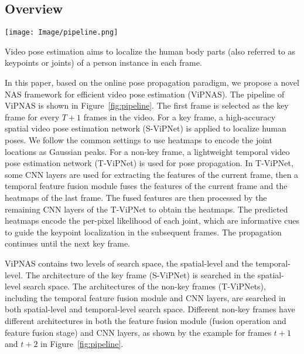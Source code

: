 \documentclass[final]{cvpr}
\begin{document}
\subsection{Overview}
\begin{figure*}[t]
	\centering
	\texttt{[image: Image/pipeline.png]}
	\caption{ViPNAS consists of one image-based key frame pose model S-ViPNet, and $T$ video-based pose model T-ViPNets containing temporal feature module and various CNN architectures. Videos are processed frame-by-frame in an online mode. S-ViPNet first predicts the pose heatmaps $H^t$ of the key frame $t$, and propagates them to the next frame $t+1$. T-ViPNet selects the CNN architecture, as well as the input features (\eg $F_1$ to $F_4$) and fusion operation (\eg Add, Cat and Mul) of fusion module. The fusion module combines the selected feature $F_2^{t+1}$ with the propagated heatmaps $H^t$, and generates the fused features $\hat{F}_2^{t+1}$ for predicting the heatmaps $H^{t+1}$.}
	\label{fig:pipeline}
\end{figure*}


Video pose estimation aims to localize the human body parts (also referred to as keypoints or joints) of a person instance in each frame. 

In this paper, based on the online pose propagation paradigm, we propose a novel NAS framework for efficient video pose estimation (ViPNAS). The pipeline of ViPNAS is shown in Figure~\ref{fig:pipeline}. The first frame is selected as the key frame for every $T+1$ frames in the video. For a key frame, a high-accuracy spatial video pose estimation network (S-ViPNet) is applied to localize human poses. We follow the common settings to use heatmaps to encode the joint locations as Gaussian peaks. For a non-key frame, a lightweight temporal video pose estimation network (T-ViPNet) is used for pose propagation. In T-ViPNet, some CNN layers are used for extracting the features of the current frame, then a temporal feature fusion module fuses the features of the current frame and the heatmaps of the last frame. The fused features are then processed by the remaining CNN layers of the T-ViPNet to obtain the heatmaps.  The predicted heatmaps encode the per-pixel likelihood of each joint, which are informative cues to guide the keypoint localization in the subsequent frames. The propagation continues until the next key frame. 

ViPNAS contains two levels of search space, \ie the spatial-level and the temporal-level. The architecture of the key frame (S-ViPNet) is searched in the spatial-level search space. The architectures of the non-key frames (T-ViPNets), including the temporal feature fusion module and CNN layers, are searched in both spatial-level and temporal-level search space. Different non-key frames have different architectures in both the feature fusion module (fusion operation and feature fusion stage) and CNN layers, as shown by the example for frames $t+1$ and $t+2$ in Figure~\ref{fig:pipeline}.
\end{document}
